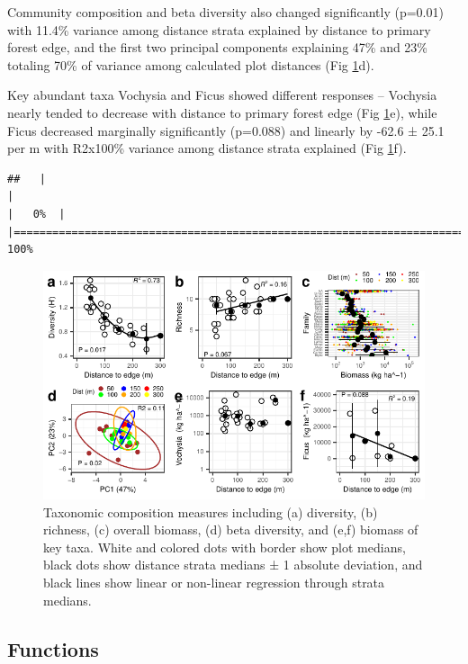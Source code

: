 \documentclass[
  12pt,
]{article}
\begin{document}
Community composition and beta diversity also changed significantly
(p=0.01) with
11.4\%
variance among distance strata explained by distance to primary forest edge,
and the first two principal components explaining
47\% and
23\% totaling
70\%
of variance among calculated plot distances
(Fig \ref{fig:taxa}d).

Key abundant taxa Vochysia and Ficus showed different responses -- Vochysia nearly tended to decrease with distance to primary forest edge
(Fig \ref{fig:taxa}e),
while Ficus decreased marginally significantly
(p=0.088)
and linearly by
-62.6 ±
25.1 per m
with R2x100\% variance among distance strata explained
(Fig \ref{fig:taxa}f).

\begin{verbatim}
##   |                                                                              |                                                                      |   0%  |                                                                              |======================================================================| 100%
\end{verbatim}

\begin{figure}
\centering
\includegraphics{merge_files/figure-latex/taxa-1.pdf}
\caption{\label{fig:taxa} Taxonomic composition measures including (a) diversity, (b) richness, (c) overall biomass, (d) beta diversity, and (e,f) biomass of key taxa. White and colored dots with border show plot medians, black dots show distance strata medians ± 1 absolute deviation, and black lines show linear or non-linear regression through strata medians.}
\end{figure}

\hypertarget{functions}{%
\subsection{Functions}\label{functions}}
\end{document}
